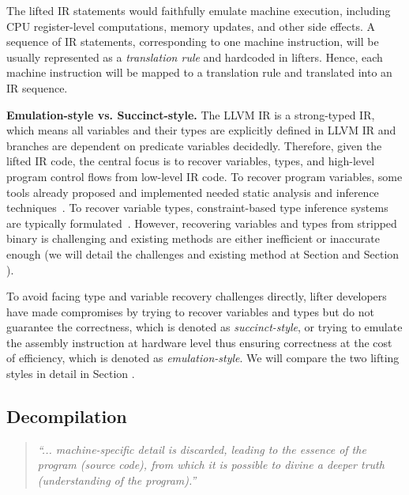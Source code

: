 The lifted IR statements would faithfully emulate machine execution, including
CPU register-level computations, memory updates, and other side effects. A
sequence of IR statements, corresponding to one machine instruction, will be
usually represented as a \textit{translation rule} and hardcoded in lifters.
Hence, each machine instruction will be mapped to a translation rule and
translated into an IR sequence.

\noindent \textbf{Emulation-style vs. Succinct-style.} The LLVM IR is a
strong-typed IR, which means all variables and their types are explicitly
defined in LLVM IR and branches are dependent on predicate variables
decidedly. Therefore, given the lifted IR code, the central focus is to
recover variables, types, and high-level program control flows from low-level
IR code. To recover program variables, some tools already proposed and
implemented needed static analysis and inference
techniques~\cite{anand2013compiler,balakrishnan2010wysinwyx,balakrishnan2007divine,reps2008improved,elwazeer2013scalable}.
To recover variable types, constraint-based type inference systems are
typically formulated~\cite{lee2011tie,noonan2016polymorphic}. However,
recovering variables and types from stripped binary is challenging and
existing methods are either inefficient or inaccurate enough (we will detail
the challenges and existing method at Section  and Section ).

To avoid facing type and variable recovery challenges directly, lifter
developers have made compromises by trying to recover variables and types but
do not guarantee the correctness, which is denoted as \textit{succinct-style},
or trying to emulate the assembly instruction at hardware level thus ensuring
correctness at the cost of efficiency, which is denoted as \textit{emulation-style}.
We will compare the two lifting styles in detail in Section .

\subsection{Decompilation} \label{sec:background-decompilation}

\begin{quote}
\textit{``... machine-specific detail is discarded, leading to the essence of
the program (source code), from which it is possible to divine a deeper truth
(understanding of the program).''}~\cite{van2007static}
\end{quote}

